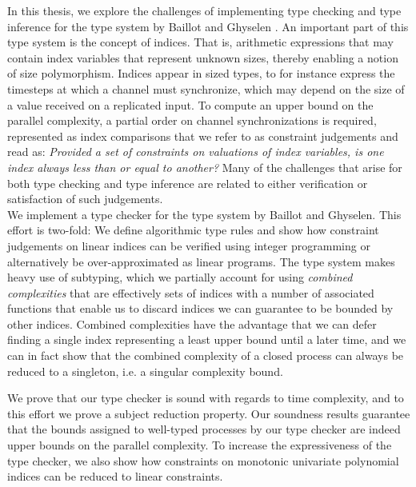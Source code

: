 In this thesis, we explore the challenges of implementing type checking and type inference for the type system by Baillot and Ghyselen \cite{BaillotGhyselen2021}. An important part of this type system is the concept of indices. That is, arithmetic expressions that may contain index variables that represent unknown sizes, thereby enabling a notion of size polymorphism. Indices appear in sized types, to for instance express the timesteps at which a channel must synchronize, which may depend on the size of a value received on a replicated input. To compute an upper bound on the parallel complexity, a partial order on channel synchronizations is required, represented as index comparisons that we refer to as constraint judgements and read as: \textit{Provided a set of constraints on valuations of index variables, is one index always less than or equal to another?} Many of the challenges that arise for both type checking and type inference are related to either verification or satisfaction of such judgements.\\%

We implement a type checker for the type system by Baillot and Ghyselen. This effort is two-fold: We define algorithmic type rules and show how constraint judgements on linear indices can be verified using integer programming or alternatively be over-approximated as linear programs. The type system makes heavy use of subtyping, which we partially account for using \textit{combined complexities} that are effectively sets of indices with a number of associated functions that enable us to discard indices we can guarantee to be bounded by other indices. Combined complexities have the advantage that we can defer finding a single index representing a least upper bound until a later time, and we can in fact show that the combined complexity of a closed process can always be reduced to a singleton, i.e. a singular complexity bound.

We prove that our type checker is sound with regards to time complexity, and to this effort we prove a subject reduction property. Our soundness results guarantee that the bounds assigned to well-typed processes by our type checker are indeed upper bounds on the parallel complexity. To increase the expressiveness of the type checker, we also show how constraints on monotonic univariate polynomial indices can be reduced to linear constraints.

